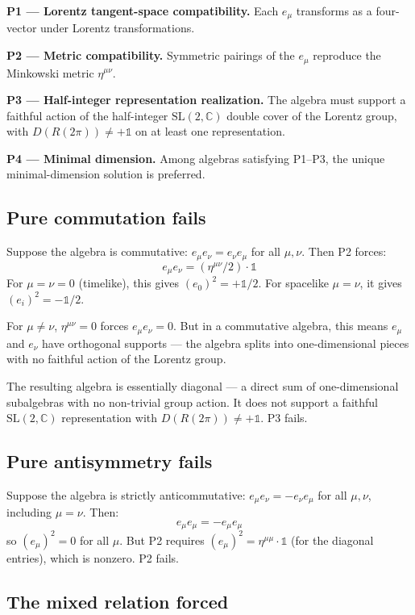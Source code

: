\documentclass[11pt,a4paper]{article}
\begin{document}
\textbf{P1 --- Lorentz tangent-space compatibility.} Each $e_\mu$ transforms as a four-vector under Lorentz transformations.

\textbf{P2 --- Metric compatibility.} Symmetric pairings of the $e_\mu$ reproduce the Minkowski metric $\eta^{\mu\nu}$.

\textbf{P3 --- Half-integer representation realization.} The algebra must support a faithful action of the half-integer $\mathrm{SL}(2,\mathbb{C})$ double cover of the Lorentz group, with $D(R(2\pi)) \neq +\mathbb{1}$ on at least one representation.

\textbf{P4 --- Minimal dimension.} Among algebras satisfying P1--P3, the unique minimal-dimension solution is preferred.

\subsection{Pure commutation fails}

Suppose the algebra is commutative: $e_\mu e_\nu = e_\nu e_\mu$ for all $\mu, \nu$. Then P2 forces:
\[
e_\mu e_\nu = (\eta^{\mu\nu} / 2) \cdot \mathbb{1}
\]
For $\mu = \nu = 0$ (timelike), this gives $(e_0)^{2} = +\mathbb{1}/2$. For spacelike $\mu = \nu$, it gives $(e_i)^{2} = -\mathbb{1}/2$.

For $\mu \neq \nu$, $\eta^{\mu\nu} = 0$ forces $e_\mu e_\nu = 0$. But in a commutative algebra, this means $e_\mu$ and $e_\nu$ have orthogonal supports --- the algebra splits into one-dimensional pieces with no faithful action of the Lorentz group.

The resulting algebra is essentially diagonal --- a direct sum of one-dimensional subalgebras with no non-trivial group action. It does not support a faithful $\mathrm{SL}(2,\mathbb{C})$ representation with $D(R(2\pi)) \neq +\mathbb{1}$. P3 fails.

\subsection{Pure antisymmetry fails}

Suppose the algebra is strictly anticommutative: $e_\mu e_\nu = -e_\nu e_\mu$ for all $\mu, \nu$, including $\mu = \nu$. Then:
\[
e_\mu e_\mu = -e_\mu e_\mu
\]
so $(e_\mu)^{2} = 0$ for all $\mu$. But P2 requires $(e_\mu)^{2} = \eta^{\mu\mu} \cdot \mathbb{1}$ (for the diagonal entries), which is nonzero. P2 fails.

\subsection{The mixed relation forced}
\end{document}
